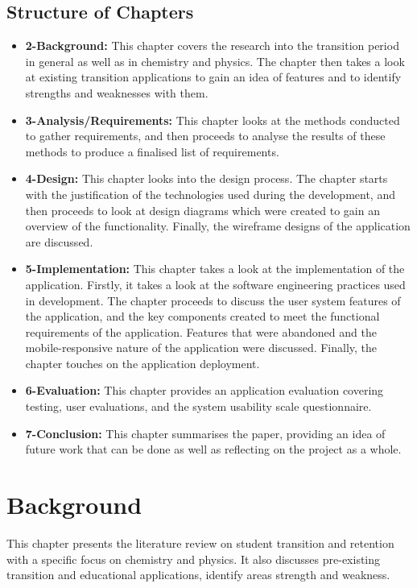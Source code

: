 \documentclass{l4proj}
\begin{document}
\section{Structure of Chapters}
\begin{itemize}
    \item \textbf{2-Background:} This chapter covers the research into the transition period in general as well as in chemistry and physics. The chapter then takes a look at existing transition applications to gain an idea of features and to identify strengths and weaknesses with them.
    \item \textbf{3-Analysis/Requirements:} This chapter looks at the methods conducted to gather requirements,  and then proceeds to analyse the results of these methods to produce a finalised list of requirements.
    \item \textbf{4-Design:} This chapter looks into the design process. The chapter starts with the justification of the technologies used during the development,  and then proceeds to look at design diagrams which were created to gain an overview of the functionality. Finally,  the wireframe designs of the application are discussed.
    \item \textbf{5-Implementation:} This chapter takes a look at the implementation of the application. Firstly,  it takes a look at the software engineering practices used in development. The chapter proceeds to discuss the user system features of the application,  and the key components created to meet the functional requirements of the application. Features that were abandoned and the mobile-responsive nature of the application were discussed. Finally,  the chapter touches on the application deployment.
    \item \textbf{6-Evaluation:} This chapter provides an application evaluation covering testing, user evaluations, and the system usability scale questionnaire.
    \item \textbf{7-Conclusion:} This chapter summarises the paper, providing an idea of future work that can be done as well as reflecting on the project as a whole.
\end{itemize}

\chapter{Background} \label{background}
This chapter presents the literature review on student transition and retention with a specific focus on chemistry and physics. It also discusses pre-existing transition and educational applications,  identify areas strength and weakness.
\end{document}
